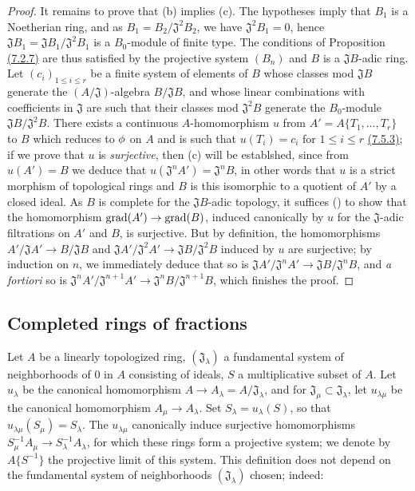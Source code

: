 \begin{proof}
It remains to prove that (b) implies (c). The hypotheses imply that $B_1$ is a Noetherian ring, and
as $B_1=B_2/\mathfrak{J}^2 B_2$, we have $\mathfrak{J}^2 B_1=0$, hence
$\mathfrak{J}B_1=\mathfrak{J}B_1/\mathfrak{J}^2 B_1$ is a $B_0$-module of finite type. The
conditions of Proposition \hyperref[prop-0.7.2.7]{(7.2.7)} are thus satisfied by the projective
system $(B_n)$ and $B$ is a $\mathfrak{J}B$-adic ring. Let $(c_i)_{1\leqslant i\leqslant r}$ be a
finite system of elements of $B$ whose classes mod $\mathfrak{J}B$ generate the
$(A/\mathfrak{J})$-algebra $B/\mathfrak{J}B$, and whose linear combinations with coefficients in
$\mathfrak{J}$ are such that their classes mod $\mathfrak{J}^2 B$ generate the $B_0$-module
$\mathfrak{J}B/\mathfrak{J}^2 B$. There exists a continuous $A$-homomorphism $u$ from
$A'=A\{T_1,\dots,T_r\}$ to $B$ which reduces to $\phi$ on $A$ and is such that $u(T_i)=c_i$ for
$1\leqslant i\leqslant r$ \hyperref[env-0.7.5.3]{(7.5.3)}; if we prove that $u$ is {\em surjective},
then (c) will be establshed, since from $u(A')=B$ we deduce that
$u(\mathfrak{J}^n A')=\mathfrak{J}^n B$, in other words that $u$ is a strict morphism of topological
rings and $B$ is this isomorphic to a quotient of $A'$ by a closed ideal. As $B$ is complete for the
$\mathfrak{J}B$-adic topology, it suffices (\cite[p.~18--07]{I-1}) to show that the homomorphism
${\mathop{\mathrm{grad}}\nolimits}(A')\to{\mathop{\mathrm{grad}}\nolimits}(B)$, induced canonically by $u$ for the $\mathfrak{J}$-adic filtrations on
$A'$ and $B$, is surjective. But by definition, the homomorphisms
$A'/\mathfrak{J}A'\to B/\mathfrak{J}B$ and
$\mathfrak{J}A'/\mathfrak{J}^2 A'\to\mathfrak{J}B/\mathfrak{J}^2 B$ induced by $u$ are surjective;
by induction on $n$, we immediately deduce that so is
$\mathfrak{J}A'/\mathfrak{J}^n A'\to\mathfrak{J}B/\mathfrak{J}^n B$, and {\em a fortiori} so is
$\mathfrak{J}^n A'/\mathfrak{J}^{n+1}A'\to\mathfrak{J}^n B/\mathfrak{J}^{n+1}B$, which finishes the
proof.
\end{proof}

\subsection{Completed rings of fractions}
\label{subsection-completed-rings-of-fractions}

\begin{env}[7.6.1]
\label{env-0.7.6.1}
Let $A$ be a linearly topologized ring, $(\mathfrak{J}_\lambda)$ a fundamental system of
neighborhoods of $0$ in $A$ consisting of ideals, $S$ a multiplicative subset of $A$. Let
$u_\lambda$ be the canonical homomorphism $A\to A_\lambda=A/\mathfrak{J}_\lambda$, and for
$\mathfrak{J}_\mu\subset\mathfrak{J}_\lambda$, let $u_{\lambda\mu}$ be the canonical
homomorphism $A_\mu\to A_\lambda$. Set $S_\lambda=u_\lambda(S)$, so that
$u_{\lambda\mu}(S_\mu)=S_\lambda$. The $u_{\lambda\mu}$ canonically induce surjective
homomorphisms $S_\mu^{-1}A_\mu\to S_\lambda^{-1}A_\lambda$, for which these rings form a
projective system; we denote by $A\{S^{-1}\}$ the projective limit of this system. This
definition does not depend on the fundamental system of neighborhoods $(\mathfrak{J}_\lambda)$
chosen; indeed:
\end{env}

